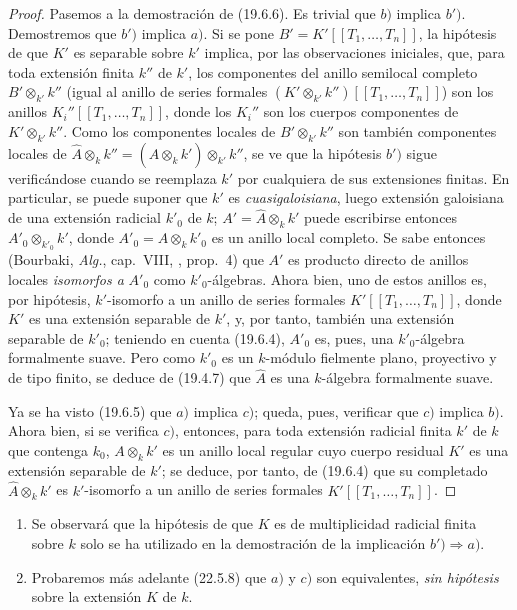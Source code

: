 \begin{proof}
Pasemos a la demostración de (19.6.6). Es trivial que $b)$ implica
$b')$. Demostremos que $b')$ implica $a)$. Si se pone
$B'=K'[[T_1,\ldots,T_n]]$, la hipótesis de que $K'$ es separable sobre $k'$
implica, por las observaciones iniciales, que, para toda extensión finita $k''$ de
$k'$, los componentes del anillo semilocal completo $B'\otimes_{k'}k''$
(igual al anillo de series formales
$(K'\otimes_{k'}k'')[[T_1,\ldots,T_n]]$) son los anillos
$K_i''[[T_1,\ldots,T_n]]$, donde los $K_i''$ son los cuerpos componentes de
$K'\otimes_{k'}k''$. Como los componentes locales de $B'\otimes_{k'}k''$ son
también componentes locales de
$\widehat A\otimes_k k''=(\widehat A\otimes_k k')\otimes_{k'}k''$,
se ve que la hipótesis $b')$ sigue verificándose cuando se reemplaza $k'$ por
cualquiera de sus extensiones finitas. En particular, se puede suponer que
$k'$ es \emph{cuasigaloisiana}, luego extensión galoisiana de una extensión
radicial $k'_0$ de $k$; $A'=\widehat A\otimes_k k'$ puede escribirse entonces
$A'_0\otimes_{k'_0}k'$, donde $A'_0=\widehat A\otimes_k k'_0$ es un anillo
local completo. Se sabe entonces (Bourbaki, \emph{Alg.}, cap.~VIII,
, prop.~4) que $A'$ es producto directo de anillos locales
\emph{isomorfos a} $A'_0$ como $k'_0$-álgebras. Ahora bien, uno de estos anillos
es, por hipótesis, $k'$-isomorfo a un anillo de series formales
$K'[[T_1,\ldots,T_n]]$, donde $K'$ es una extensión separable de $k'$, y, por
tanto, también una extensión separable de $k'_0$; teniendo en cuenta
(19.6.4), $A'_0$ es, pues, una $k'_0$-álgebra formalmente suave. Pero como
$k'_0$ es un $k$-módulo fielmente plano, proyectivo y de tipo finito, se deduce
de (19.4.7) que $\widehat A$ es una $k$-álgebra formalmente suave.

Ya se ha visto (19.6.5) que $a)$ implica $c)$; queda, pues, verificar que
$c)$ implica $b)$. Ahora bien, si se verifica $c)$, entonces, para toda
extensión radicial finita $k'$ de $k$ que contenga $k_0$, $A\otimes_k k'$ es
un anillo local regular cuyo cuerpo residual $K'$ es una extensión separable de
$k'$; se deduce, por tanto, de (19.6.4) que su completado
$\widehat A\otimes_k k'$ es $k'$-isomorfo a un anillo de series formales
$K'[[T_1,\ldots,T_n]]$.
\end{proof}

\begin{remarks}[19.6.7]
\label{0.19.6.7-fr}
\begin{enumerate}
  \item[\rm(i)] Se observará que la hipótesis de que $K$ es de multiplicidad
  radicial finita sobre $k$ solo se ha utilizado en la demostración de la
  implicación $b')\Rightarrow a)$.
  \item[\rm(ii)] Probaremos más adelante (22.5.8) que $a)$ y $c)$ son
  equivalentes, \emph{sin hipótesis} sobre la extensión $K$ de $k$.
\end{enumerate}
\end{remarks}

